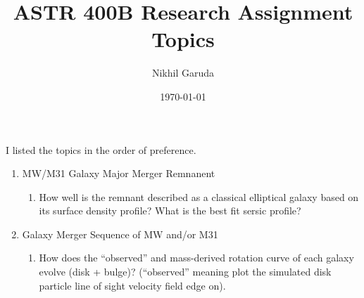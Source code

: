 \documentclass[12pt]{article}
\title{ASTR 400B Research Assignment Topics}
\author{Nikhil Garuda}
\date{\today}
\begin{document}
\maketitle
I listed the topics in the order of preference.
\begin{enumerate}
    \item MW/M31 Galaxy Major Merger Remnanent
        \begin{enumerate}
            \item  How well is the remnant
            described as a classical elliptical galaxy based on its surface density profile? What
            is the best fit sersic profile?
        \end{enumerate}
    \item Galaxy Merger Sequence of MW and/or M31
        \begin{enumerate}
            \item How does the “observed” and mass-derived rotation curve of each galaxy evolve (disk + bulge)? (“observed” meaning plot the simulated disk particle line of sight velocity field edge on).
        \end{enumerate}
\end{enumerate}
\end{document}
